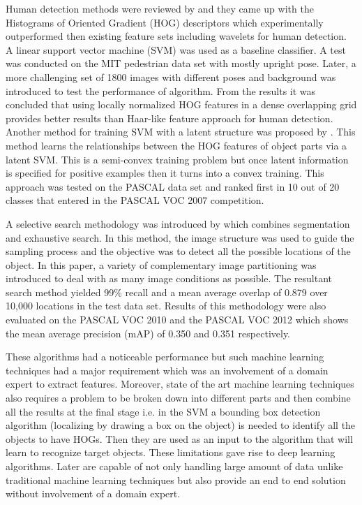 \documentclass[11pt]{article}
\begin{document}
Human detection methods were reviewed by \cite{dalal2005histograms} and they came up with the Histograms of Oriented Gradient (HOG) descriptors which experimentally outperformed then existing feature sets including wavelets for human detection. A linear support vector machine (SVM) was used as a baseline classifier. A test was conducted on the MIT pedestrian data set with mostly upright pose. Later, a more challenging set of 1800 images with different poses and background was introduced to test the performance of algorithm. From the results it was concluded that using locally normalized HOG features in a dense overlapping grid provides better results than Haar-like feature approach for human detection. Another method for training SVM with a latent structure was proposed by \cite{felzenszwalb2008discriminatively}. This method learns the relationships between the HOG features of object parts via a latent SVM. This is a semi-convex training problem but once latent information is specified for positive examples then it turns into a convex training. This approach was tested on the PASCAL data set and ranked first in 10 out of 20 classes that entered in the PASCAL VOC 2007 competition.

A selective search methodology was introduced by \cite{uijlings2013selective} which combines segmentation and exhaustive search. In this method, the image structure was used to guide the sampling process and the objective was to detect all the possible locations of the object. In this paper, a variety of complementary image partitioning was introduced to deal with as many image conditions as possible. The resultant search method yielded 99\% recall and a mean average overlap of 0.879 over 10,000 locations in the test data set. Results of this methodology were also evaluated on the PASCAL VOC 2010 and the PASCAL VOC 2012 which shows the mean average precision (mAP) of 0.350 and 0.351 respectively.

These algorithms had a noticeable performance but such machine learning techniques had a major requirement which was an involvement of a domain expert to extract features. Moreover, state of the art machine learning techniques also requires a problem to be broken down into different parts and then combine all the results at the final stage i.e. in the SVM a bounding box detection algorithm (localizing by drawing a box on the object) is needed to identify all the objects to have HOGs. Then they are used as an input to the algorithm that will learn to recognize target objects. These limitations gave rise to deep learning algorithms. Later are capable of not only handling large amount of data unlike traditional machine learning techniques but also provide an end to end solution without involvement of a domain expert.
\end{document}
